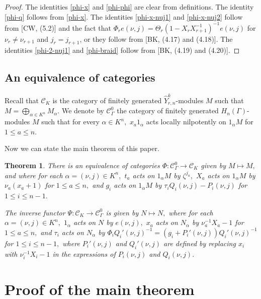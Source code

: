 \documentclass[11pt, reqno]{amsart} \textwidth=14.9cm \oddsidemargin=1cm \evensidemargin=1cm
\newtheorem{theorem}{Theorem}[section]
\theoremstyle{definition}
\numberwithin{equation}{section}
\begin{document}
\begin{proof}
The identities \eqref{phi-x} and \eqref{phi-phi} are clear from definitions. The identity \eqref{phi-q} follows from \eqref{phi-x}. The identities \eqref{phi-x-nuj1} and \eqref{phi-x-nuj2} follow from [CW, (5.2)] and the fact that $\Phi_r e(\nu, j) = \Theta_r (1-X_{r}X_{r+1}^{-1})^{-1} e(\nu, j)$ for $\nu_{r}\neq \nu_{r+1}$ and $j_{r}=j_{r+1}$, or they follow from [BK, (4.17) and (4.18)]. The identities \eqref{phi-2-nuj1} and \eqref{phi-braid} follow from [BK, (4.19) and (4.20)].\end{proof}


\subsection{An equivalence of categories}
Recall that $\mathcal{C}_{K}$ is the category of finitely generated $\widehat{Y}_{r,n}^{k}$-modules $M$ such that $M=\bigoplus_{\alpha\in K^{n}}M_{\alpha}.$ We denote by $\mathcal{C}_{\Gamma}^{0}$ the category of finitely generated $H_{n}(\Gamma)$-modules $M$ such that for every $\alpha\in K^{n},$ $x_{a}1_{\alpha}$ acts locally nilpotently on $1_{\alpha}M$ for $1\leq a\leq n.$

Now we can state the main theorem of this paper.
\begin{theorem}\label{Morita-equi}
There is an equivalence of categories $\Phi: \mathcal{C}_{\Gamma}^{0}\rightarrow \mathcal{C}_{K}$ given by $M\mapsto M,$ and where for each $\alpha=(\nu, j)\in K^{n},$ $t_{a}$ acts on $1_{\alpha}M$ by $\zeta^{j_{a}},$ $X_{a}$ acts on $1_{\alpha}M$ by $\nu_{a}(x_{a}+1)$ for $1\leq a\leq n,$ and $g_{i}$ acts on $1_{\alpha}M$ by $\tau_{i}Q_{i}(\nu, j)-P_{i}(\nu, j)$ for $1\leq i\leq n-1.$

The inverse functor $\Psi: \mathcal{C}_{K}\rightarrow \mathcal{C}_{\Gamma}^{0}$ is given by $N\mapsto N,$ where for each $\alpha=(\nu, j)\in K^{n},$ $1_{\alpha}$ acts on $N$ by $e(\nu, j),$ $x_{a}$ acts on $N_{\alpha}$ by $\nu_{a}^{-1}X_{a}-1$ for $1\leq a\leq n,$ and $\tau_{i}$ acts on $N_{\alpha}$ by $\Phi_{i}Q_{i}'(\nu, j)^{-1}=(g_{i}+P_{i}'(\nu, j))Q_{i}'(\nu, j)^{-1}$ for $1\leq i\leq n-1,$ where $P_{i}'(\nu, j)$ and $Q_{i}'(\nu, j)$ are defined by replacing $x_{i}$ with $\nu_{i}^{-1}X_{i}-1$ in the expressions of $P_{i}(\nu, j)$ and $Q_{i}(\nu, j).$
\end{theorem}



\section{Proof of the main theorem}
\end{document}
